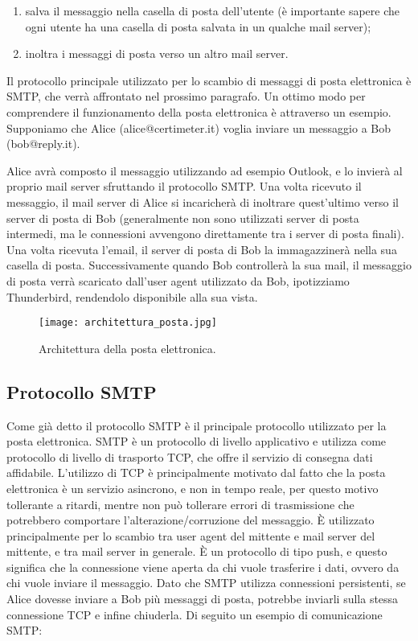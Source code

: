 \begin{enumerate}
    \item salva il messaggio nella casella di posta dell'utente (è importante sapere che ogni utente ha una casella di posta salvata in un qualche mail server);
    \item inoltra i messaggi di posta verso un altro mail server.
\end{enumerate}

Il protocollo principale utilizzato per lo scambio di messaggi di posta elettronica è SMTP, 
che verrà affrontato nel prossimo paragrafo.
Un ottimo modo per comprendere il funzionamento della posta elettronica è attraverso un esempio.
Supponiamo che Alice (alice@certimeter.it) voglia inviare un messaggio a Bob (bob@reply.it).

Alice avrà composto il messaggio utilizzando ad esempio Outlook, e lo invierà al proprio mail server 
sfruttando il protocollo SMTP. Una volta ricevuto il messaggio, il mail server di Alice si incaricherà di 
inoltrare quest'ultimo verso il server di posta di Bob (generalmente non sono utilizzati server di posta intermedi, 
ma le connessioni avvengono direttamente tra i server di posta finali). 
Una volta ricevuta l'email, il server di posta di Bob la immagazzinerà nella sua casella di posta. 
Successivamente quando Bob controllerà la sua mail, il messaggio di posta verrà scaricato dall'user agent 
utilizzato da Bob, ipotizziamo Thunderbird, rendendolo disponibile alla sua vista\cite{kurose2008reti}.

\begin{figure}[htp]
    \centering
    \texttt{[image: architettura\_posta.jpg]}
        \caption{Architettura della posta elettronica\cite{kurose2008reti}.}\label{architetturaPosta}
  \end{figure}


\subsection{Protocollo SMTP}
Come già detto il protocollo SMTP è il principale protocollo utilizzato per la posta elettronica.
SMTP è un protocollo di livello applicativo e utilizza come protocollo di livello di trasporto TCP,
che offre il servizio di consegna dati affidabile. 
L'utilizzo di TCP è principalmente motivato dal fatto che la posta elettronica è un servizio asincrono, 
e non in tempo reale, per questo motivo tollerante a ritardi, mentre non può tollerare errori di trasmissione 
che potrebbero comportare l'alterazione/corruzione del messaggio. 
È utilizzato principalmente per lo scambio tra user agent del mittente e mail server del mittente, e tra mail server 
in generale. È un protocollo di tipo push, e questo significa che la connessione viene aperta da chi vuole 
trasferire i dati, ovvero da chi vuole inviare il messaggio. Dato che SMTP utilizza connessioni persistenti, 
se Alice dovesse inviare a Bob più messaggi di posta, potrebbe inviarli sulla stessa connessione TCP e 
infine chiuderla.
Di seguito un esempio di comunicazione SMTP:

